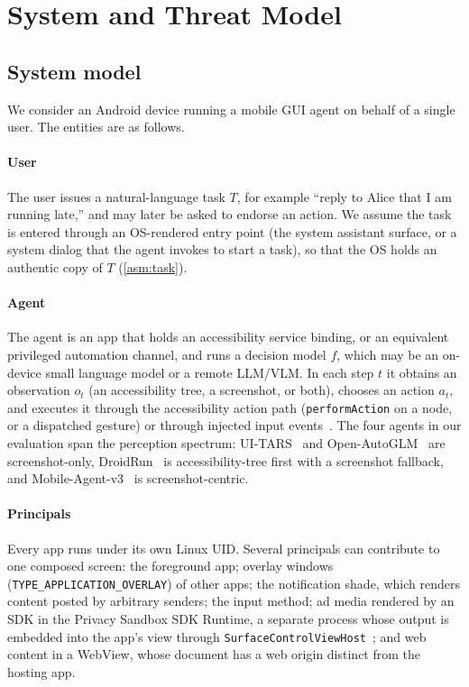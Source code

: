 \section{System and Threat Model}\label{sec:model}

\subsection{System model}\label{sec:sysmodel}

We consider an Android device running a mobile GUI agent on behalf of a single user. The entities are as follows.

\paragraph{User} The user issues a natural-language task $T$, for example ``reply to Alice that I am running late,'' and may later be asked to endorse an action. We assume the task is entered through an OS-rendered entry point (the system assistant surface, or a system dialog that the agent invokes to start a task), so that the OS holds an authentic copy of $T$ (\cref{asm:task}).

\paragraph{Agent} The agent is an app that holds an accessibility service binding, or an equivalent privileged automation channel, and runs a decision model $f$, which may be an on-device small language model or a remote LLM/VLM. In each step $t$ it obtains an observation $o_t$ (an accessibility tree, a screenshot, or both), chooses an action $a_t$, and executes it through the accessibility action path (\texttt{performAction} on a node, or a dispatched gesture) or through injected input events~\cite{android_accessibilitynodeinfo}. The four agents in our evaluation span the perception spectrum: UI-TARS~\cite{qin2025uitars} and Open-AutoGLM~\cite{openautoglm2025software} are screenshot-only, DroidRun~\cite{droidrun2025software} is accessibility-tree first with a screenshot fallback, and Mobile-Agent-v3~\cite{ye2025mobileagentv3} is screenshot-centric.

\paragraph{Principals} Every app runs under its own Linux UID. Several principals can contribute to one composed screen: the foreground app; overlay windows (\texttt{TYPE\_APPLICATION\_OVERLAY}) of other apps; the notification shade, which renders content posted by arbitrary senders; the input method; ad media rendered by an SDK in the Privacy Sandbox SDK Runtime, a separate process whose output is embedded into the app's view through \texttt{SurfaceControlViewHost}~\cite{android_sdkruntime}; and web content in a WebView, whose document has a web origin distinct from the hosting app.

